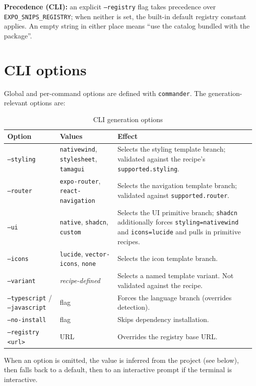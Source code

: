 \textbf{Precedence (CLI):} an explicit \texttt{--registry} flag takes precedence
over \texttt{EXPO\_SNIPS\_REGISTRY}; when neither is set, the built-in default
registry constant applies. An empty string in either place means ``use the
catalog bundled with the package''.

\section{CLI options}

Global and per-command options are defined with \texttt{commander}. The
generation-relevant options are:

\begin{longtable}{p{3.4cm}p{3.4cm}p{6.8cm}}
\caption{CLI generation options}\\
\toprule
\textbf{Option} & \textbf{Values} & \textbf{Effect} \\
\midrule

\texttt{--styling} & \texttt{nativewind}, \texttt{stylesheet},
\texttt{tamagui} & Selects the styling template branch; validated against the
recipe's \texttt{supported.styling}. \\
\texttt{--router} & \texttt{expo-router}, \texttt{react-navigation} & Selects the
navigation template branch; validated against
\texttt{supported.router}. \\
\texttt{--ui} & \texttt{native}, \texttt{shadcn}, \texttt{custom} & Selects the UI
primitive branch; \texttt{shadcn} additionally forces
\texttt{styling=nativewind} and \texttt{icons=lucide} and pulls in primitive
recipes. \\
\texttt{--icons} & \texttt{lucide}, \texttt{vector-icons}, \texttt{none} &
Selects the icon template branch. \\
\texttt{--variant} & \textit{recipe-defined} & Selects a named template variant.
Not validated against the recipe. \\
\texttt{--typescript} / \texttt{--javascript} & flag & Forces the language branch
(overrides detection). \\
\texttt{--no-install} & flag & Skips dependency installation. \\
\texttt{--registry <url>} & URL & Overrides the registry base URL. \\
\bottomrule
\end{longtable}

When an option is omitted, the value is inferred from the project (see below),
then falls back to a default, then to an interactive prompt if the terminal is
interactive.

